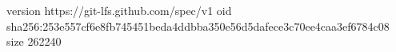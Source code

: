 version https://git-lfs.github.com/spec/v1
oid sha256:253e557cf6e8fb745451beda4ddbba350e56d5dafece3c70ee4caa3ef6784c08
size 262240
